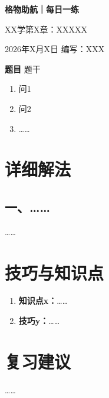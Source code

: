 \documentclass[11pt,a4paper]{ctexart}
\begin{document}
\begin{center}
  {\Large\bfseries\color{mainblue} 格物助航｜每日一练}\par
  \vspace{0.25em}
  {\large XX学第X章：XXXXX}\par
  \vspace{0.35em}
  {\small 2026年X月X日}
  \vspace{0.35em}
  {\small 编写：XXX}
\end{center}

\vspace{-0.3em}

\begin{problemBox}
\noindent\textbf{题目}\quad
题干
\begin{enumerate}
  \item 问1
  \item 问2
  \item ……
\end{enumerate}
\end{problemBox}


\section*{详细解法}

\subsection*{一、……}

……

\section*{技巧与知识点}

\begin{tipBox}
\begin{enumerate}
  \item \textbf{知识点x：}……
  \item \textbf{技巧y：}……
\end{enumerate}
\end{tipBox}

\section*{复习建议}

……
\end{document}
